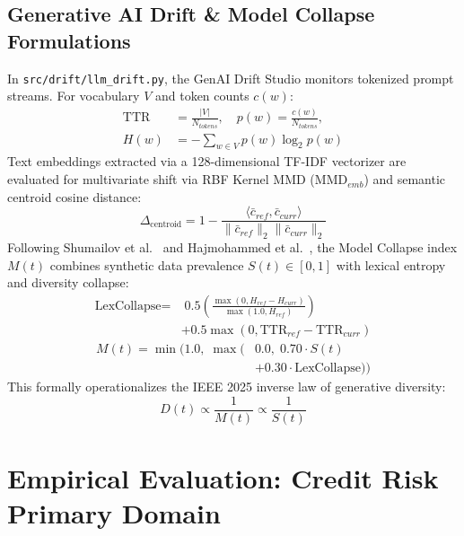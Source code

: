 \documentclass[conference]{IEEEtran}
\begin{document}
\subsection{Generative AI Drift \& Model Collapse Formulations}
In \texttt{src/drift/llm\_drift.py}, the GenAI Drift Studio monitors tokenized prompt streams. For vocabulary $V$ and token counts $c(w)$:
\begin{equation}
\begin{aligned}
\text{TTR} &= \frac{|V|}{N_{tokens}}, \quad p(w) = \frac{c(w)}{N_{tokens}}, \\
H(w) &= - \sum_{w \in V} p(w) \log_2 p(w)
\end{aligned}
\end{equation}
Text embeddings extracted via a 128-dimensional TF-IDF vectorizer are evaluated for multivariate shift via RBF Kernel MMD ($\text{MMD}_{emb}$) and semantic centroid cosine distance:
\begin{equation}
\Delta_{\text{centroid}} = 1 - \frac{\langle \bar{c}_{ref}, \bar{c}_{curr} \rangle}{\|\bar{c}_{ref}\|_2 \|\bar{c}_{curr}\|_2}
\end{equation}
Following Shumailov et al.~\cite{shumailov2024ai} and Hajmohammed et al.~\cite{hajmohammed2025concept}, the Model Collapse index $M(t)$ combines synthetic data prevalence $S(t) \in [0, 1]$ with lexical entropy and diversity collapse:
\begin{equation}
\begin{aligned}
\text{LexCollapse} =&\; 0.5 \left( \frac{\max(0, H_{ref} - H_{curr})}{\max(1.0, H_{ref})} \right) \\
&+ 0.5 \max\left(0, \text{TTR}_{ref} - \text{TTR}_{curr}\right)
\end{aligned}
\end{equation}
\begin{equation}
\begin{aligned}
M(t) = \min\Big(1.0,\; \max\big(&0.0,\; 0.70 \cdot S(t) \\
&+ 0.30 \cdot \text{LexCollapse}\big)\Big)
\end{aligned}
\end{equation}
This formally operationalizes the IEEE 2025 inverse law of generative diversity:
\begin{equation}
D(t) \propto \frac{1}{M(t)} \propto \frac{1}{S(t)}
\end{equation}

\section{Empirical Evaluation: Credit Risk Primary Domain}
\end{document}
